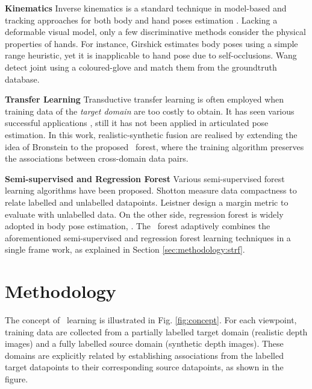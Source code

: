 \noindent\textbf{Kinematics}   
Inverse kinematics is a standard technique in model-based and tracking approaches for both body \cite{Yao_IJCV_12, Pons_ICCV_11} and hand poses estimation \cite{Gorce_PAMI_11, Oikonomidis_CVPR_12, Stenger_PAMI_06}. Lacking a deformable visual model, only a few discriminative methods consider the physical properties of hands. For instance, Girshick \etal \cite{Girshick_ICCV_11} estimates body poses using a simple range heuristic, yet it is inapplicable to hand pose due to self-occlusions.  
Wang \etal \cite{Wang_TOG_09} detect joint using a coloured-glove and match them from the groundtruth database. 

\noindent\textbf{Transfer Learning} 
Transductive transfer learning is often employed when training data of the \emph{target domain} are too costly to obtain. It has seen various successful applications \cite{Pan_TKDE_10}, still it has not been applied in articulated pose estimation. In this work, realistic-synthetic fusion are realised by extending the idea of Bronstein \etal \cite{Bronstein_CVPR_11} to the proposed \STR\ forest, where the training algorithm preserves the associations between cross-domain data pairs.

\noindent\textbf{Semi-supervised and Regression Forest} Various semi-supervised forest learning algorithms have been proposed. Shotton \etal \cite{Shotton_Book_13} measure data compactness to relate labelled and unlabelled datapoints. Leistner \etal \cite{Leistner_ICCV_09} design a margin metric to evaluate with unlabelled data. On the other side, regression forest is widely adopted in body pose estimation, \eg \cite{Girshick_ICCV_11, Sun_CVPR_12}. The \STR\ forest adaptively combines the aforementioned semi-supervised and regression forest learning techniques in a single frame work, as explained in Section \ref{sec:methodology:strf}.


\section{Methodology}

The concept of \STR\ learning is illustrated in Fig. \ref{fig:concept}. 
For each viewpoint, training data are collected from a partially labelled target domain (realistic depth images) and a fully labelled source domain (synthetic depth images). These domains are explicitly related by establishing associations from the labelled target datapoints to their corresponding source datapoints, as shown in the figure. 

